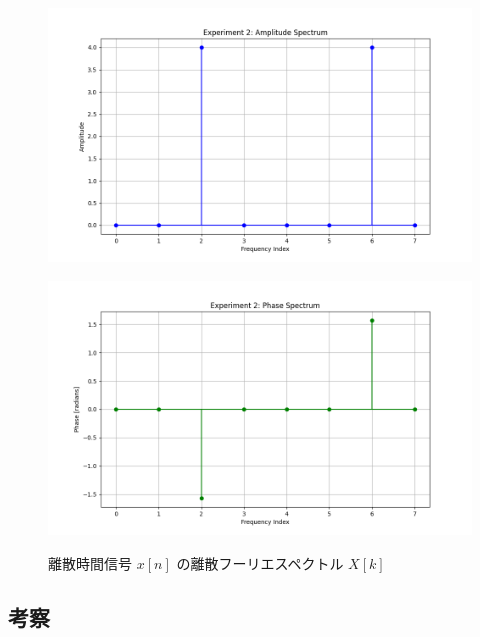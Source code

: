 \documentclass[fleqn, a4paper. 12pt]{jsarticle}
\begin{document}
  \begin{figure}[h]
    \begin{center}
    \begin{minipage}[t]{0.48\columnwidth}
        \includegraphics[width=\columnwidth]{amplitude_spectrum_experiment_2.png}
        \label{fign:a2}
    \end{minipage}
    \begin{minipage}[t]{0.48\columnwidth}
        \includegraphics[width=\columnwidth]{phase_spectrum_experiment_2.png}
        \label{fign:p2}
    \end{minipage}
    \end{center}
    \caption{離散時間信号 $x[n]$ の離散フーリエスペクトル $X[k]$}
  \end{figure}

  \subsection*{考察}
\end{document}
